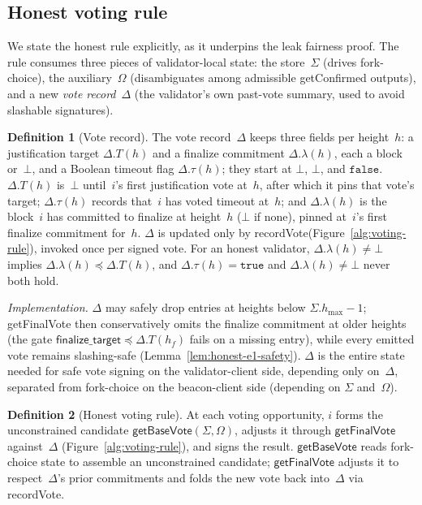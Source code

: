 \ifx\litemode\undefined\documentclass{article}\fi
\newcommand{\finalizeTarget}{\mathsf{finalize\_target}}
\newcommand{\hmax}{\ensuremath{h_{\max}}\xspace}
\newcommand{\getBaseVote}{\textsf{getBaseVote}\xspace}
\newcommand{\getFinalVote}{\textsf{getFinalVote}\xspace}
\newcommand{\recordVote}{\textsf{recordVote}\xspace}
\newcommand{\getConfirmed}{\textsf{getConfirmed}\xspace}
\theoremstyle{plain}
\theoremstyle{definition}
\newtheorem{definition}{Definition}
\theoremstyle{remark}
\begin{document}
\subsection{Honest voting rule}

We state the honest rule explicitly, as it underpins the leak fairness proof.
The rule consumes three pieces of validator-local state: the store~$\Sigma$ (drives fork-choice), the auxiliary~$\Omega$ (disambiguates among admissible \getConfirmed outputs), and a new \emph{vote record}~$\Delta$ (the validator's own past-vote summary, used to avoid slashable signatures).

\begin{definition}[Vote record]\label{def:voterecord}
The vote record~$\Delta$ keeps three fields per height~$h$: a justification target $\Delta.T(h)$ and a finalize commitment $\Delta.\lambda(h)$, each a block or~$\bot$, and a Boolean timeout flag $\Delta.\tau(h)$; they start at $\bot$, $\bot$, and $\mathtt{false}$.
$\Delta.T(h)$ is~$\bot$ until~$i$'s first justification vote at~$h$, after which it pins that vote's target; $\Delta.\tau(h)$ records that~$i$ has voted timeout at~$h$; and $\Delta.\lambda(h)$ is the block~$i$ has committed to finalize at height~$h$ ($\bot$ if none), pinned at~$i$'s first finalize commitment for~$h$.
$\Delta$ is updated only by \recordVote (Figure~\ref{alg:voting-rule}), invoked once per signed vote.
For an honest validator, $\Delta.\lambda(h) \neq \bot$ implies $\Delta.\lambda(h) \preceq \Delta.T(h)$, and $\Delta.\tau(h) = \mathtt{true}$ and $\Delta.\lambda(h) \neq \bot$ never both hold.

\smallskip
\noindent\emph{Implementation.}
$\Delta$ may safely drop entries at heights below $\Sigma.\hmax - 1$; \getFinalVote then conservatively omits the finalize commitment at older heights (the gate $\finalizeTarget \preceq \Delta.T(h_f)$ fails on a missing entry), while every emitted vote remains slashing-safe (Lemma~\ref{lem:honest-e1-safety}).
$\Delta$ is the entire state needed for safe vote signing on the validator-client side, depending only on~$\Delta$, separated from fork-choice on the beacon-client side (depending on $\Sigma$ and~$\Omega$).
\end{definition}

\begin{definition}[Honest voting rule]\label{def:voting-rule}
At each voting opportunity, $i$ forms the unconstrained candidate $\getBaseVote(\Sigma, \Omega)$, adjusts it through $\getFinalVote$ against~$\Delta$ (Figure~\ref{alg:voting-rule}), and signs the result.
$\getBaseVote$ reads fork-choice state to assemble an unconstrained candidate; $\getFinalVote$ adjusts it to respect~$\Delta$'s prior commitments and folds the new vote back into~$\Delta$ via \recordVote.
\end{definition}
\end{document}
